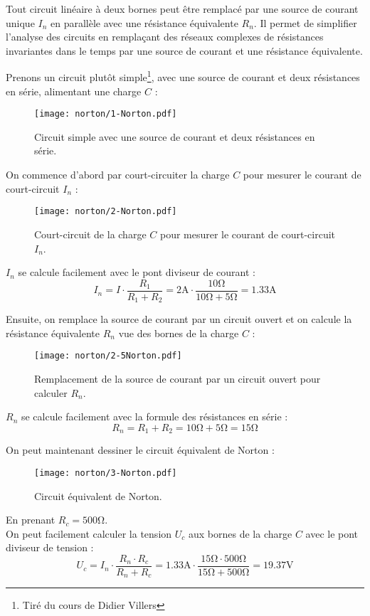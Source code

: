 Tout circuit lin\'eaire à deux bornes peut \^etre remplac\'e par une source de courant
unique \(I_{n}\) en parall\`ele avec une r\'esistance \'equivalente \(R_{n}\). Il permet
de simplifier l’analyse des circuits en remplaçant des r\'eseaux complexes de r\'esistances
invariantes dans le temps par une source de courant et une r\'esistance \'equivalente.

Prenons un circuit plut\^ot simple\footnote{Tir\'e du cours de Didier Villers}, avec une source de courant et deux r\'esistances
en s\'erie, alimentant une charge \(C\) :
\begin{figure}[H]
    \centering
    \texttt{[image: norton/1-Norton.pdf]}
    \caption{Circuit simple avec une source de courant et deux r\'esistances en s\'erie.}
\end{figure}

On commence d'abord par court-circuiter la charge \(C\) pour mesurer le courant de court-circuit \(I_{n}\) :
\begin{figure}[H]
    \centering
    \texttt{[image: norton/2-Norton.pdf]}
    \caption{Court-circuit de la charge \(C\) pour mesurer le courant de court-circuit \(I_{n}\).}
\end{figure}

\(I_{n}\) se calcule facilement avec le pont diviseur de courant :
\[
I_{n} = I \cdot \frac{R_1}{R_1 + R_2} = 2\unit{\ampere} \cdot \frac{10\unit{\ohm}}{10\unit{\ohm} + 5\unit{\ohm}} = 1.33\unit{\ampere}
\]

Ensuite, on remplace la source de courant par un circuit ouvert et on calcule la
r\'esistance \'equivalente \(R_{n}\) vue des bornes de la charge \(C\) :
\begin{figure}[H]
    \centering
    \texttt{[image: norton/2-5Norton.pdf]}
    \caption{Remplacement de la source de courant par un circuit ouvert pour calculer \(R_{n}\).}
\end{figure}

\(R_{n}\) se calcule facilement avec la formule des r\'esistances en s\'erie :
\[
R_{n} = R_{1} + R_{2} = 10\unit{\ohm} + 5\unit{\ohm} = 15\unit{\ohm}
\]

On peut maintenant dessiner le circuit \'equivalent de Norton :
\begin{figure}[H]
    \centering
    \texttt{[image: norton/3-Norton.pdf]}
    \caption{Circuit \'equivalent de Norton.}
    \label{fig:norton-equivalent}
\end{figure}
En prenant \(R_c=500\unit{\ohm}\).\\
On peut facilement calculer la tension \(U_{c}\) aux bornes de la charge \(C\) avec le pont diviseur de tension :
\[
U_{c} = I_{n} \cdot \frac{R_{n} \cdot R_{c}}{R_{n} + R_{c}} = 1.33\unit{\ampere} \cdot \frac{15\unit{\ohm} \cdot 500\unit{\ohm}}{15\unit{\ohm} + 500\unit{\ohm}} = 19.37\unit{\volt}
\]

